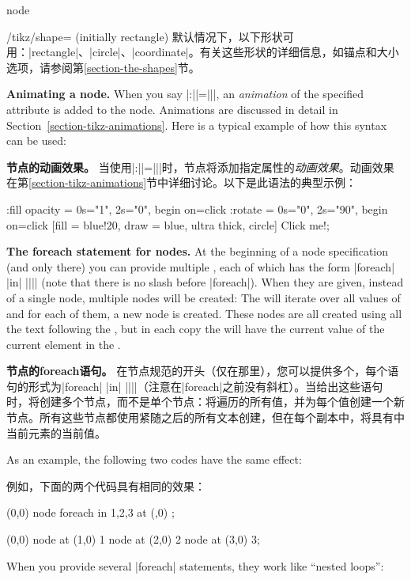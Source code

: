 \begin{pathoperation}{node}
\begin{key}{/tikz/shape= (initially rectangle)}
        默认情况下，以下形状可用：|rectangle|、|circle|、|coordinate|。有关这些形状的详细信息，如锚点和大小选项，请参阅第\ref{section-the-shapes}节。
    \end{key}

    \medskip
    \textbf{Animating a node.}
    When you say |:||={||}|, an
    \emph{animation} of the specified attribute is added to the node.
    Animations are discussed in detail in
    Section~\ref{section-tikz-animations}. Here is a typical example of how
    this syntax can be used:

    \textbf{节点的动画效果。}
当使用|:||={||}|时，节点将添加指定属性的\emph{动画效果}。动画效果在第\ref{section-tikz-animations}节中详细讨论。以下是此语法的典型示例：
\begin{codeexample}[preamble={\usetikzlibrary{animations}},animation list={0.5,1,1.5,2}]
\tikz
  \node  :fill opacity = { 0s="1", 2s="0", begin on=click }
         :rotate = { 0s="0", 2s="90", begin on=click }
         [fill = blue!20, draw = blue, ultra thick, circle]
    {Click me!};
\end{codeexample}

    \medskip
    \textbf{The foreach statement for nodes.}
    At the beginning of a node specification (and only there) you can provide
    multiple , each of which has the form |foreach|
     |in| |{||}| (note that there is no slash before
    |foreach|). When they are given, instead of a single node, multiple nodes
    will be created: The  will iterate over all values of 
    and for each of them, a new node is created. These nodes are all created
    using all the text following the , but in each
    copy the  will have the current value of the current element in
    the .

    \textbf{节点的foreach语句。}
在节点规范的开头（仅在那里），您可以提供多个，每个语句的形式为|foreach|  |in| |{||}|（注意在|foreach|之前没有斜杠）。当给出这些语句时，将创建多个节点，而不是单个节点：将遍历的所有值，并为每个值创建一个新节点。所有这些节点都使用紧随之后的所有文本创建，但在每个副本中，将具有中当前元素的当前值。

    As an example, the following two codes have the same effect:

    例如，下面的两个代码具有相同的效果：
\begin{codeexample}[]
\tikz \draw (0,0) node foreach \x in {1,2,3} at (\x,0) {\x};
\end{codeexample}
\begin{codeexample}[]
\tikz \draw (0,0) node at (1,0) {1} node at (2,0) {2} node at (3,0) {3};
\end{codeexample}
%
    When you provide several |foreach| statements, they work like ``nested
    loops'':


\end{pathoperation}
